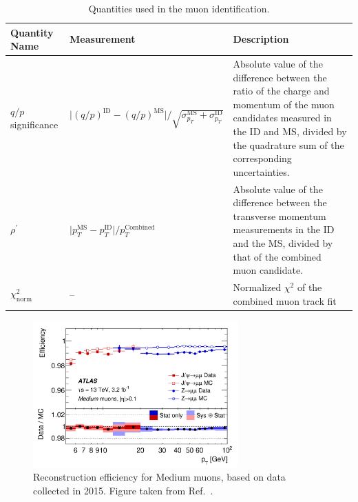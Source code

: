 \begin{table}[!htb]
    \begin{center}
        \caption{
            Quantities used in the muon identification.
        }
        \label{tab:muon_id_vars}
        \begin{tabularx}{\textwidth}{l|X|X}
        \hline
        \hline
        \textbf{Quantity Name} & \textbf{Measurement} & \textbf{Description} \\
        \hline
        $q/p$ significance & $\lvert (q/p)^{\text{ID}} - (q/p)^{\text{MS}} \rvert / \sqrt{ \sigma_{p_T}^{\text{MS}} + \sigma_{p_T}^{\text{ID}}}$ &
                Absolute value of the difference between the ratio of the charge and momentum of the muon candidates measured in the ID and MS,
                divided by the quadrature sum of the corresponding uncertainties. \\
        \hline
        $\rho^{\prime}$ & $\lvert p_T^{\text{MS}} - p_T^{\text{ID}} \rvert / p_T^{\text{Combined}}$ &
                Absolute value of the difference between the transverse momentum measurements in the ID and the MS,
                divided by that of the combined muon candidate. \\
        \hline
        $\chi^2_{\text{norm}}$ & -- & Normalized $\chi^2$ of the combined muon track fit \\
        \hline
        \hline
        \end{tabularx}
    \end{center}
\end{table}

\begin{figure}[!htb]
    \begin{center}
        \includegraphics[width=0.7\textwidth]{figures/chapter3/muon/muon_reco_eff_medium}
        \caption{
            Reconstruction efficiency for Medium muons, based on data collected in 2015.
            Figure taken from Ref.~\cite{Aad:2016jkr}.
        }
        \label{fig:muon_reco_eff}
    \end{center}
\end{figure}


